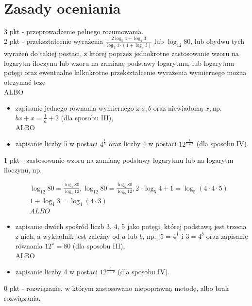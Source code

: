 \documentclass[10pt]{article}
\begin{document}
\section*{Zasady oceniania}
3 pkt - przeprowadzenie pełnego rozumowania.\\
2 pkt - przekształcenie wyrażenia $\frac{2 \log _{5} 4+\log _{4} 3}{\log _{5} 4 \cdot\left(1+\log _{4} 3\right)}$ lub $\log _{12} 80$, lub obydwu tych wyrażeń do takiej postaci, z której poprzez jednokrotne zastosowanie wzoru na\\
logarytm iloczynu lub wzoru na zamianę podstawy logarytmu, lub logarytmu potęgi oraz ewentualne kilkukrotne przekształcenie wyrażenia wymiernego można otrzymać teze\\
ALBO

\begin{itemize}
  \item zapisanie jednego równania wymiernego z $a, b$ oraz niewiadomą $x, \mathrm{np}$. $b x+x=\frac{1}{a}+2$ (dla sposobu III),\\
ALBO
  \item zapisanie liczby 5 w postaci $4^{\frac{1}{a}}$ oraz liczby 4 w postaci $12^{\frac{1}{1+b}}$ (dla sposobu IV).
\end{itemize}

1 pkt - zastosowanie wzoru na zamianę podstawy logarytmu lub na logarytm iloczynu, np.

$$
\begin{aligned}
& \log _{12} 80=\frac{\log _{4} 80}{\log _{4} 12}, \log _{12} 80=\frac{\log _{5} 80}{\log _{5} 12}, 2 \cdot \log _{5} 4+1=\log _{5}(4 \cdot 4 \cdot 5) \\
& 1+\log _{4} 3=\log _{4}(4 \cdot 3) \\
& A L B O
\end{aligned}
$$

\begin{itemize}
  \item zapisanie dwóch spośród liczb 3, 4, 5 jako potęgi, której podstawą jest trzecia z nich, a wykładnik jest zależny od $a$ lub $b$, np.: $5=4^{\frac{1}{a}}$ i $3=4^{b}$ oraz zapisanie równania $12^{x}=80$ (dla sposobu III),\\
ALBO
  \item zapisanie liczby 4 w postaci $12^{\frac{1}{1+b}}$ (dla sposobu IV).
\end{itemize}

0 pkt - rozwiązanie, w którym zastosowano niepoprawną metodę, albo brak rozwiązania.
\end{document}
